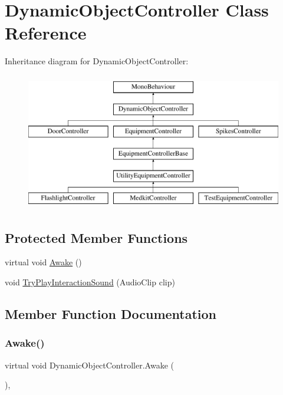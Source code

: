 \hypertarget{class_dynamic_object_controller}{}\section{Dynamic\+Object\+Controller Class Reference}
\label{class_dynamic_object_controller}
Inheritance diagram for Dynamic\+Object\+Controller\+:\begin{figure}[H]
\begin{center}
\leavevmode
\includegraphics[height=6.000000cm]{class_dynamic_object_controller}
\end{center}
\end{figure}
\subsection*{Protected Member Functions}
\begin{DoxyCompactItemize}
\item 
virtual void \mbox{\hyperlink{class_dynamic_object_controller_ac82dd85f0560a3ba17e50cc1254fbca3}{Awake}} ()
\item 
void \mbox{\hyperlink{class_dynamic_object_controller_a923cc1baa90750f9df291a5c33c310b5}{Try\+Play\+Interaction\+Sound}} (Audio\+Clip clip)
\end{DoxyCompactItemize}


\subsection{Member Function Documentation}
\mbox{\label{class_dynamic_object_controller_ac82dd85f0560a3ba17e50cc1254fbca3}} 
\subsubsection{\texorpdfstring{Awake()}{Awake()}}
{\footnotesize\ttfamily virtual void Dynamic\+Object\+Controller.\+Awake (\begin{DoxyParamCaption}{ }\end{DoxyParamCaption})\hspace{0.3cm}{\ttfamily [protected]}, {\ttfamily [virtual]}}



